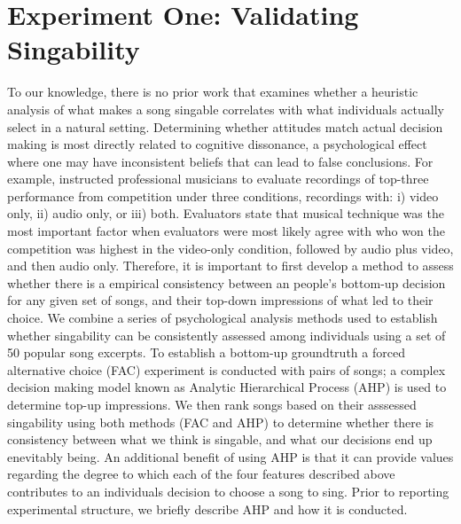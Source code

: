 \section{Experiment One: Validating Singability}
To our knowledge, there is no prior work that examines whether a heuristic analysis of what makes a song singable correlates with what individuals actually select in a natural setting. Determining whether attitudes match actual decision making is most directly related to cognitive dissonance, a psychological effect where one may have inconsistent beliefs that can lead to false conclusions. For example, \cite{tsay2013sight} instructed professional musicians to evaluate recordings of top-three performance from competition under three conditions, recordings with: i) video only, ii) audio only, or iii) both. Evaluators state that musical technique was the most important factor when evaluators were most likely agree with who won the competition was highest in the video-only condition, followed by audio plus video, and then audio only. Therefore, it is important to first develop a method to assess whether there is a empirical consistency between an people's bottom-up decision for any given set of songs, and their top-down impressions of what led to their choice. We combine a series of psychological analysis methods used to establish whether singability can be consistently assessed among individuals using a set of 50 popular song excerpts. To establish a bottom-up groundtruth a forced alternative choice (FAC) experiment is conducted with pairs of songs; a complex decision making model known as Analytic Hierarchical Process (AHP) \cite{saaty1990make} is used to determine top-up impressions. We then rank songs based on their asssessed singability using both methods (FAC and AHP) to determine whether there is consistency between what we think is singable, and what our decisions end up enevitably being. An additional benefit of using AHP is that it can provide values regarding the degree to which each of the four features described above contributes to an individuals decision to choose a song to sing. Prior to reporting experimental structure, we briefly describe AHP and how it is conducted.




